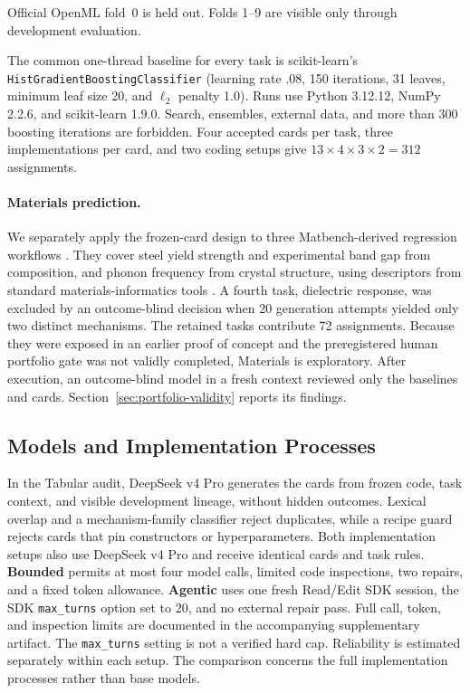 \documentclass[letterpaper]{article}
\begin{document}
Official OpenML fold~0 is held out. Folds 1--9 are visible only through development evaluation.

The common one-thread baseline for every task is scikit-learn's \texttt{HistGradientBoostingClassifier} (learning rate .08, 150 iterations, 31 leaves, minimum leaf size 20, and $\ell_2$ penalty 1.0). Runs use Python 3.12.12, NumPy 2.2.6, and scikit-learn 1.9.0. Search, ensembles, external data, and more than 300 boosting iterations are forbidden. Four accepted cards per task, three implementations per card, and two coding setups give $13 \times 4 \times 3 \times 2=312$ assignments.

\paragraph{Materials prediction.} We separately apply the frozen-card design to three Matbench-derived regression workflows \cite{dunn2020matbench}. They cover steel yield strength and experimental band gap from composition, and phonon frequency from crystal structure, using descriptors from standard materials-informatics tools \cite{ward2018matminer}. A fourth task, dielectric response, was excluded by an outcome-blind decision when 20 generation attempts yielded only two distinct mechanisms. The retained tasks contribute 72 assignments. Because they were exposed in an earlier proof of concept and the preregistered human portfolio gate was not validly completed, Materials is exploratory. After execution, an outcome-blind model in a fresh context reviewed only the baselines and cards. Section~\ref{sec:portfolio-validity} reports its findings.

\subsection{Models and Implementation Processes}

In the Tabular audit, DeepSeek v4 Pro generates the cards from frozen code, task context, and visible development lineage, without hidden outcomes. Lexical overlap and a mechanism-family classifier reject duplicates, while a recipe guard rejects cards that pin constructors or hyperparameters. Both implementation setups also use DeepSeek v4 Pro and receive identical cards and task rules. \textbf{Bounded} permits at most four model calls, limited code inspections, two repairs, and a fixed token allowance. \textbf{Agentic} uses one fresh Read/Edit SDK session, the SDK \texttt{max\_turns} option set to 20, and no external repair pass. Full call, token, and inspection limits are documented in the accompanying supplementary artifact. The \texttt{max\_turns} setting is not a verified hard cap. Reliability is estimated separately within each setup. The comparison concerns the full implementation processes rather than base models.
\end{document}
